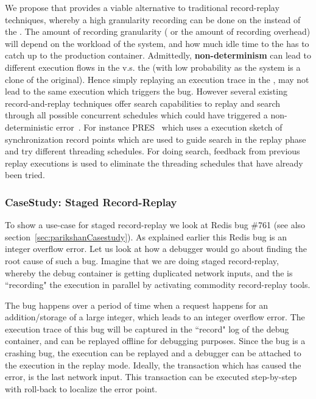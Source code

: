 We propose that \parikshan provides a viable alternative to traditional record-replay techniques, whereby a high granularity recording can be done on the \debugcontainer instead of the \productioncontainer.
The amount of recording granularity ( or the amount of recording overhead) will depend on the workload of the system, and how much idle time to the \debugcontainer has to catch up to the production container. 
Admittedly, \textbf{non-determinism} can lead to different execution flows in the \debugcontainer v.s. the \productioncontainer (with low probability as the system is a clone of the original).
Hence simply replaying an execution trace in the \debugcontainer, may not lead to the same execution which triggers the bug.
However several existing record-and-replay techniques offer search capabilities to replay and search through all possible concurrent schedules which could have triggered a non-deterministic error~\cite{dpor,best}.
For instance PRES~\cite{pres} which uses a execution sketch of synchronization record points which are used to guide search in the replay phase and try different threading schedules. For doing search, feedback from previous replay executions is used to eliminate the threading schedules that have already been tried. 


\subsubsection{CaseStudy: Staged Record-Replay}

To show a use-case for staged record-replay we look at Redis bug \#761 (see also section~\ref{sec:parikshanCasestudy}). 
As explained earlier this Redis bug is an integer overflow error.
Let us look at how a debugger would go about finding the root cause of such a bug.
Imagine that we are doing staged record-replay, whereby the debug container is getting duplicated network inputs, and the \debugcontainer is ``recording" the execution in parallel by activating commodity record-replay tools.

The bug happens over a period of time when a request happens for an addition/storage of a large integer, which leads to an integer overflow error.
The execution trace of this bug will be captured in the ``record" log of the debug container, and can be replayed offline for debugging purposes.
Since the bug is a crashing bug, the execution can be replayed and a debugger can be attached to the execution in the replay mode.
Ideally, the transaction which has caused the error, is the last network input. 
This transaction can be executed step-by-step with roll-back to localize the error point.

